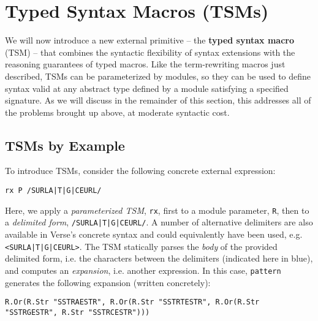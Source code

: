 \chapter{Typed Syntax Macros (TSMs)}\label{chap:tsms}
We will now introduce a new external primitive -- the \textbf{typed syntax macro} (TSM) -- that combines the syntactic flexibility of syntax extensions with the reasoning guarantees of typed macros. Like the term-rewriting macros just described, TSMs can be parameterized by modules, so they can be used to define syntax valid at any abstract type defined by a module satisfying a specified signature. As we will discuss in the remainder of this section, this addresses all of the problems brought up above, at moderate syntactic cost.

\section{TSMs by Example}\label{sec:tsms-by-example}
To introduce TSMs, consider the following concrete external expression:
\begin{lstlisting}[numbers=none]
rx P /SURLA|T|G|CEURL/
\end{lstlisting}
Here, we apply a \emph{parameterized TSM}, \lstinline{rx}, first to a module parameter, \lstinline{R}, then to a \emph{delimited form}, \lstinline{/SURLA|T|G|CEURL/}. A number of alternative delimiters are also available in Verse's concrete syntax and could equivalently have been used, e.g. \lstinline{<SURLA|T|G|CEURL>}. The TSM statically parses the \emph{body} of the provided delimited form, i.e. the characters between the delimiters (indicated here in blue), and computes an \emph{expansion}, i.e. another expression. In this case, \lstinline{pattern} generates the following expansion (written concretely):

\begin{lstlisting}[numbers=none]
R.Or(R.Str "SSTRAESTR", R.Or(R.Str "SSTRTESTR", R.Or(R.Str "SSTRGESTR", R.Str "SSTRCESTR")))
\end{lstlisting}

